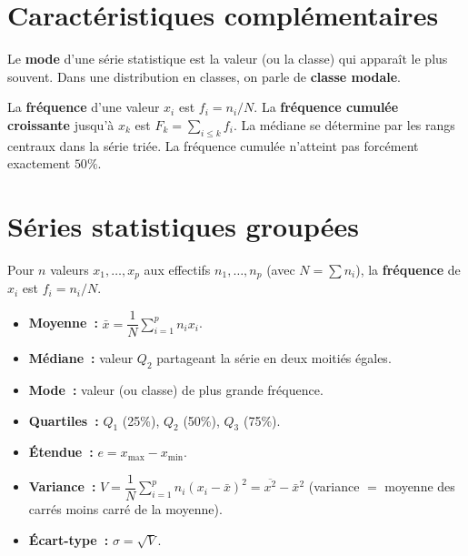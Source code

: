 \section{Caract\'eristiques compl\'ementaires}

\begin{defn}
Le \textbf{mode} d'une s\'erie statistique est la valeur (ou la classe) qui
appara\^it le plus souvent. Dans une distribution en classes, on parle de
\textbf{classe modale}.
\end{defn}

\begin{defn}
La \textbf{fr\'equence} d'une valeur $x_i$ est $f_i = n_i / N$.
La \textbf{fr\'equence cumul\'ee croissante} jusqu'\`a $x_k$ est
$F_k = \displaystyle\sum_{i \leq k} f_i$.
La m\'ediane se d\'etermine par les rangs centraux dans la s\'erie tri\'ee.
La fr\'equence cumul\'ee n'atteint pas forc\'ement exactement $50\%$.
\end{defn}


\section{S\'eries statistiques group\'ees}

\begin{defn}
Pour $n$ valeurs $x_1,\ldots,x_p$ aux effectifs $n_1,\ldots,n_p$
(avec $N=\sum n_i$), la \textbf{fr\'equence} de $x_i$ est $f_i=n_i/N$.
\end{defn}

\begin{defn}
\begin{itemize}
  \item \textbf{Moyenne~:} $\bar{x} = \dfrac{1}{N}\sum_{i=1}^p n_i x_i$.
  \item \textbf{M\'ediane~:} valeur $Q_2$ partageant la s\'erie en deux moiti\'es \'egales.
  \item \textbf{Mode~:} valeur (ou classe) de plus grande fr\'equence.
  \item \textbf{Quartiles~:} \ExtensionTTen{} $Q_1$ (25\%), $Q_2$ (50\%), $Q_3$ (75\%).
\end{itemize}
\end{defn}

\begin{defn}
\begin{itemize}
  \item \textbf{\'Etendue~:} $e = x_{\max} - x_{\min}$.
  \item \textbf{Variance~:}
        $V = \dfrac{1}{N}\sum_{i=1}^p n_i(x_i-\bar{x})^2
           = \overline{x^2} - \bar{x}^2$
        (variance $=$ moyenne des carr\'es moins carr\'e de la moyenne).
  \item \textbf{\'Ecart-type~:} $\sigma = \sqrt{V}$.
\end{itemize}
\end{defn}

